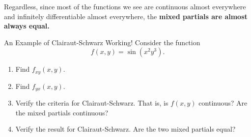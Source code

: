  Regardless, since most of the functions we see are continuous almost everywhere and infinitely differentiable almost everywhere, the \textbf{mixed partials are almost always equal.}
 
 \begin{exercise}{An Example of Clairaut-Schwarz Working!}
 Consider the function $$f(x,y)=\sin(x^2y^3).$$
 \begin{enumerate}
 \item Find $f_{xy}(x,y)$.
 \vspace{1em}
 \item Find $f_{yx}(x,y)$.
 \vspace{1em}
 \item Verify the criteria for Clairaut-Schwarz. That is, is $f(x,y)$ continuous? Are the mixed partials continuous?
 \vspace{1em}
 \item Verify the result for Clairaut-Schwarz. Are the two mixed partials equal?
 \end{enumerate}
 \end{exercise}
